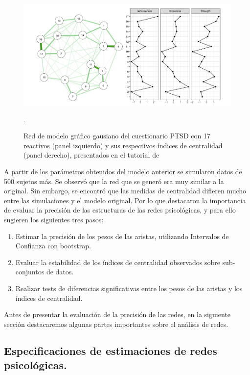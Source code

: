 \documentclass[11pt,spanish]{article}\usepackage[]{graphicx}\usepackage[]{color}
\begin{document}
\begin{figure}[!ht]
\centering
\includegraphics[scale=0.5]{images/red_medidas_tutorial}
\caption{Red de modelo gráfico gausiano del cuestionario PTSD con 17 reactivos (panel izquierdo) y sus respectivos índices de centralidad (panel derecho), presentados en el tutorial de \cite{main_tutorial}}.
\label{fig:tuto_red}
\end{figure}

A partir de los parámetros obtenidos del modelo anterior se simularon datos de 500 sujetos más. Se observó que la red que se generó era muy similar a la original. Sin embargo, se encontró que las medidas de centralidad difieren mucho entre las simulaciones y el modelo original. Por lo que destacaron la importancia de evaluar la precisión de las estructuras de las redes psicológicas, y para ello sugieren los siguientes tres pasos: 

\begin{enumerate}
  \item Estimar la precisión de los pesos de las aristas, utilizando Intervalos de Confianza con bootstrap.
  \item Evaluar la estabilidad de los índices de centralidad observados sobre sub-conjuntos de datos.
  \item Realizar tests de diferencias significativas entre los pesos de las aristas y los índices de centralidad. 
\end{enumerate}

Antes de presentar la evaluación de la precisión de las redes, en la siguiente sección destacaremos algunas partes importantes sobre el análisis de redes.

\subsection*{Especificaciones de estimaciones de redes psicológicas.}
\end{document}
